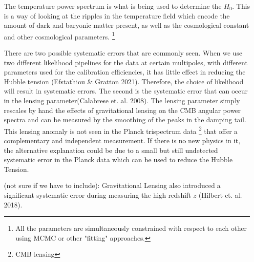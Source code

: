 The temperature power spectrum is what is being used to determine the $H_0$. This is a way of looking at the ripples in the temperature field which encode the amount of dark and baryonic matter present, as well as the cosmological constant and other cosmological parameters.
\footnote{All the parameters are simultaneously constrained with respect to each other using MCMC or other "fitting" approaches. }

There are two possible systematic errors that are commonly seen. When we use two different likelihood pipelines for the data at certain multipoles, with different parameters used for the calibration efficiencies, it has little effect in reducing the Hubble tension (Efstathiou $\&$ Gratton 2021). Therefore, the choice of likelihood will result in systematic errors. 
The second is the systematic error that can occur in the lensing parameter(Calabrese et. al. 2008). The lensing parameter simply rescales by hand the effects of gravitational lensing on the CMB angular power spectra and can be measured by the smoothing of the peaks in the damping tail. This lensing anomaly is not seen in the
Planck trispectrum data \footnote{CMB lensing} that offer a complementary and independent measurement. If there is no new physics in it, the alternative explanation could be due to a small but still undetected systematic error in the Planck data which can be used to reduce the Hubble Tension.

(not sure if we have to include):
Gravitational Lensing also introduced a significant systematic error during measuring the high redshift $z$ (Hilbert et. al. 2018). 
